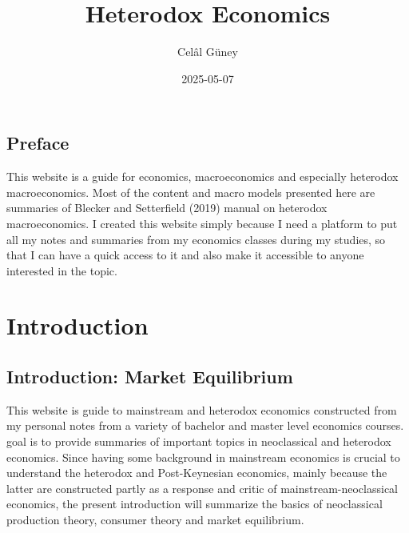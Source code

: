 \documentclass[
  letterpaper,
  DIV=11,
  numbers=noendperiod]{scrreprt}
\title{Heterodox Economics}
\author{Celâl Güney}
\date{2025-05-07}
\renewcommand*\contentsname{Table of contents}
\newcommand\contentsname{Table of contents}
\begin{document}
\maketitle
\ifdefined\Shaded\renewenvironment{Shaded}{\begin{tcolorbox}[frame hidden, interior hidden, enhanced, boxrule=0pt, breakable, borderline west={3pt}{0pt}{shadecolor}, sharp corners]}{\end{tcolorbox}}\fi

\renewcommand*\contentsname{Table of contents}
{
\hypersetup{linkcolor=}
\setcounter{tocdepth}{2}
\tableofcontents
}

\hypertarget{preface}{%
\chapter*{Preface}\label{preface}}


This website is a guide for economics, macroeconomics and especially
heterodox macroeconomics. Most of the content and macro models presented
here are summaries of Blecker and Setterfield (2019) manual on heterodox
macroeconomics. I created this website simply because I need a platform
to put all my notes and summaries from my economics classes during my
studies, so that I can have a quick access to it and also make it
accessible to anyone interested in the topic.

\part{Introduction}

\hypertarget{introduction-market-equilibrium}{%
\chapter{Introduction: Market
Equilibrium}\label{introduction-market-equilibrium}}

This website is guide to mainstream and heterodox economics constructed
from my personal notes from a variety of bachelor and master level
economics courses. goal is to provide summaries of important topics in
neoclassical and heterodox economics. Since having some background in
mainstream economics is crucial to understand the heterodox and
Post-Keynesian economics, mainly because the latter are constructed
partly as a response and critic of mainstream-neoclassical economics,
the present introduction will summarize the basics of neoclassical
production theory, consumer theory and market equilibrium.
\end{document}
